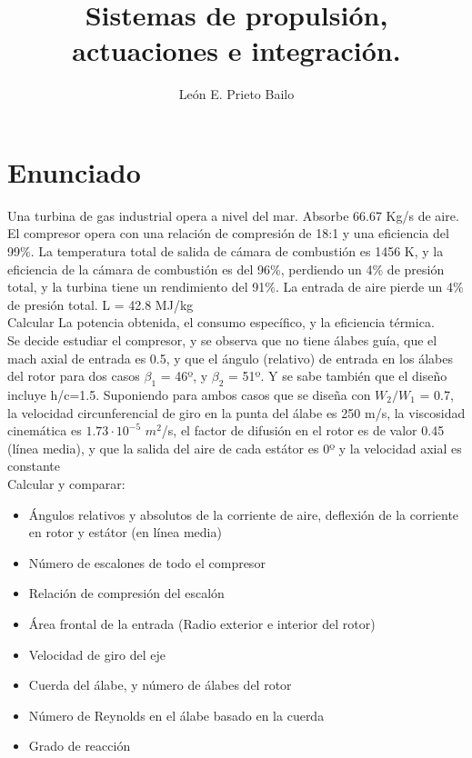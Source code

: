 \documentclass{report}
\title{Sistemas de propulsión, actuaciones e integración.}
\author{León E. Prieto Bailo}
\begin{document}
\maketitle


\section{Enunciado}

Una turbina de gas industrial opera a nivel del mar. Absorbe 66.67 Kg/s de aire. El compresor opera con una relación de compresión de 18:1 y una eficiencia del 99\%. La temperatura total de salida de cámara de combustión es 1456 K, y la eficiencia de la cámara de combustión es del 96\%, perdiendo un 4\% de presión total, y la turbina tiene un rendimiento del 91\%. La entrada de aire pierde un 4\% de presión total. L = 42.8 MJ/kg\\

Calcular La potencia obtenida, el consumo específico, y la eficiencia térmica.\\

Se decide estudiar el compresor, y se observa que no tiene álabes guía, que el mach axial de entrada es 0.5, y que el ángulo (relativo) de entrada en los álabes del rotor para dos casos $\beta_1$ = 46º, y $\beta_2$ = 51º. Y se sabe también que el diseño incluye h/c=1.5. Suponiendo para ambos casos que se diseña con $W_2/W_1$ = 0.7, la velocidad circunferencial de giro en la punta del álabe es 250 m/s, la viscosidad cinemática es $1.73\cdot10^{-5}$ $m^2$/s, el factor de difusión en el rotor es de valor 0.45 (línea media), y que la salida del aire de cada estátor es 0º y la velocidad axial es constante\\

Calcular y comparar:\

\begin{itemize}
\item Ángulos relativos y absolutos de la corriente de aire, deflexión de la corriente en rotor y estátor (en línea media)
\item Número de escalones de todo el compresor
\item Relación de compresión del escalón
\item Área frontal de la entrada (Radio exterior e interior del rotor)
\item Velocidad de giro del eje
\item Cuerda del álabe, y número de álabes del rotor
\item Número de Reynolds en el álabe basado en la cuerda
\item Grado de reacción
\end{itemize}
\newpage
\end{document}
